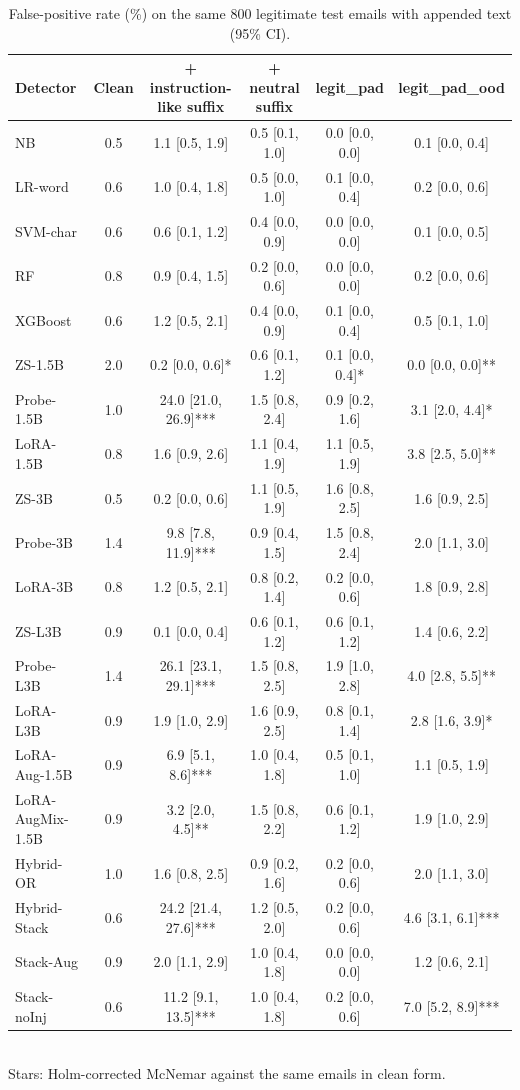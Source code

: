 \begin{table}[t]
\centering
\caption{False-positive rate (\%) on the same 800 legitimate test emails with appended text (95\% CI).}
\label{tab:collateral}
\footnotesize
\begin{tabular}{lccccc}
\toprule
\textbf{Detector} & \textbf{Clean} & \textbf{+ instruction-like suffix} & \textbf{+ neutral suffix} & \textbf{legit\_pad} & \textbf{legit\_pad\_ood} \\
\midrule
NB & 0.5 & 1.1 [0.5, 1.9] & 0.5 [0.1, 1.0] & 0.0 [0.0, 0.0] & 0.1 [0.0, 0.4] \\
LR-word & 0.6 & 1.0 [0.4, 1.8] & 0.5 [0.0, 1.0] & 0.1 [0.0, 0.4] & 0.2 [0.0, 0.6] \\
SVM-char & 0.6 & 0.6 [0.1, 1.2] & 0.4 [0.0, 0.9] & 0.0 [0.0, 0.0] & 0.1 [0.0, 0.5] \\
RF & 0.8 & 0.9 [0.4, 1.5] & 0.2 [0.0, 0.6] & 0.0 [0.0, 0.0] & 0.2 [0.0, 0.6] \\
XGBoost & 0.6 & 1.2 [0.5, 2.1] & 0.4 [0.0, 0.9] & 0.1 [0.0, 0.4] & 0.5 [0.1, 1.0] \\
ZS-1.5B & 2.0 & 0.2 [0.0, 0.6]* & 0.6 [0.1, 1.2] & 0.1 [0.0, 0.4]* & 0.0 [0.0, 0.0]** \\
Probe-1.5B & 1.0 & 24.0 [21.0, 26.9]*** & 1.5 [0.8, 2.4] & 0.9 [0.2, 1.6] & 3.1 [2.0, 4.4]* \\
LoRA-1.5B & 0.8 & 1.6 [0.9, 2.6] & 1.1 [0.4, 1.9] & 1.1 [0.5, 1.9] & 3.8 [2.5, 5.0]** \\
ZS-3B & 0.5 & 0.2 [0.0, 0.6] & 1.1 [0.5, 1.9] & 1.6 [0.8, 2.5] & 1.6 [0.9, 2.5] \\
Probe-3B & 1.4 & 9.8 [7.8, 11.9]*** & 0.9 [0.4, 1.5] & 1.5 [0.8, 2.4] & 2.0 [1.1, 3.0] \\
LoRA-3B & 0.8 & 1.2 [0.5, 2.1] & 0.8 [0.2, 1.4] & 0.2 [0.0, 0.6] & 1.8 [0.9, 2.8] \\
ZS-L3B & 0.9 & 0.1 [0.0, 0.4] & 0.6 [0.1, 1.2] & 0.6 [0.1, 1.2] & 1.4 [0.6, 2.2] \\
Probe-L3B & 1.4 & 26.1 [23.1, 29.1]*** & 1.5 [0.8, 2.5] & 1.9 [1.0, 2.8] & 4.0 [2.8, 5.5]** \\
LoRA-L3B & 0.9 & 1.9 [1.0, 2.9] & 1.6 [0.9, 2.5] & 0.8 [0.1, 1.4] & 2.8 [1.6, 3.9]* \\
LoRA-Aug-1.5B & 0.9 & 6.9 [5.1, 8.6]*** & 1.0 [0.4, 1.8] & 0.5 [0.1, 1.0] & 1.1 [0.5, 1.9] \\
LoRA-AugMix-1.5B & 0.9 & 3.2 [2.0, 4.5]** & 1.5 [0.8, 2.2] & 0.6 [0.1, 1.2] & 1.9 [1.0, 2.9] \\
Hybrid-OR & 1.0 & 1.6 [0.8, 2.5] & 0.9 [0.2, 1.6] & 0.2 [0.0, 0.6] & 2.0 [1.1, 3.0] \\
Hybrid-Stack & 0.6 & 24.2 [21.4, 27.6]*** & 1.2 [0.5, 2.0] & 0.2 [0.0, 0.6] & 4.6 [3.1, 6.1]*** \\
Stack-Aug & 0.9 & 2.0 [1.1, 2.9] & 1.0 [0.4, 1.8] & 0.0 [0.0, 0.0] & 1.2 [0.6, 2.1] \\
Stack-noInj & 0.6 & 11.2 [9.1, 13.5]*** & 1.0 [0.4, 1.8] & 0.2 [0.0, 0.6] & 7.0 [5.2, 8.9]*** \\
\bottomrule
\end{tabular}
\\[2pt]{\scriptsize Stars: Holm-corrected McNemar against the same emails in clean form.}
\end{table}